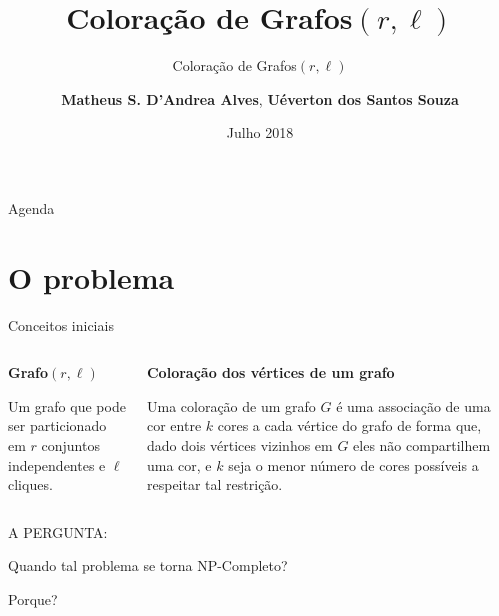 \documentclass[9pt, compress]{beamer}
\author{\textbf{Matheus S. D'Andrea Alves}, \textbf{Uéverton dos Santos Souza} }
\title{Coloração de Grafos$(r,\ell)$}
\subtitle{Coloração de Grafos$(r,\ell)$}
\institute{\textbf{Universidade Federal Fluminense}}
\date{Julho 2018}
\newcommand{\?}{\textcolor{warn}{\textit{?}}}
\begin{document}
    \maketitle
    \begin{frame}{Agenda}
    \centering
        \tableofcontents
    \end{frame}
    \section{O problema}
    \begin{frame}{Conceitos iniciais}
      \begin{columns}
        \begin{column}{0.5\textwidth}
          \textbf{Grafo$(r,\ell)$}
          
          Um grafo que pode ser particionado em $r$ conjuntos independentes e $\ell$ cliques.
        \end{column}
        \begin{column}{0.5\textwidth}
          \textbf{Coloração dos vértices de um grafo}
          
          Uma coloração de um grafo $G$ é uma associação de uma cor entre $k$ cores a cada vértice do grafo de forma que, dado dois vértices vizinhos em $G$ eles não compartilhem uma cor, e $k$ seja o menor número de cores possíveis a respeitar tal restrição. 
        \end{column}
      \end{columns}
    \end{frame}
    \begin{frame}[standout]
      A PERGUNTA:
      
      Quando tal problema se torna NP-Completo? 
      
      Porque?
    \end{frame}
\end{document}
